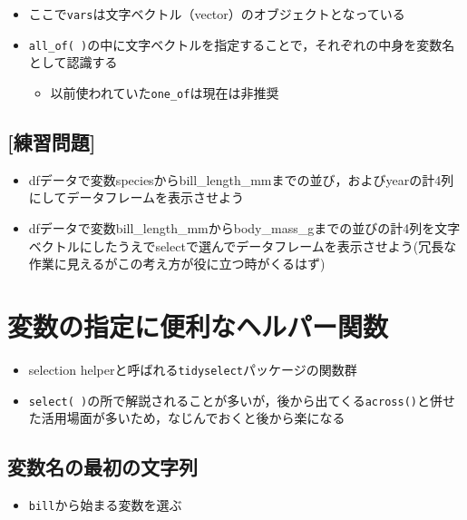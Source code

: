 \documentclass[
  xelatex,ja=standard, b5paper]{bxjsbook}
\providecommand{\tightlist}{%
  \setlength{\itemsep}{0pt}\setlength{\parskip}{0pt}}
\begin{document}
\begin{itemize}
\tightlist
\item
  ここで\texttt{vars}は文字ベクトル（vector）のオブジェクトとなっている
\item
  \texttt{all\_of(\ )}の中に文字ベクトルを指定することで，それぞれの中身を変数名として認識する

  \begin{itemize}
  \tightlist
  \item
    以前使われていた\texttt{one\_of}は現在は非推奨
  \end{itemize}
\end{itemize}

\hypertarget{ux7df4ux7fd2ux554fux984c}{%
\subsection{{[}練習問題{]}}\label{ux7df4ux7fd2ux554fux984c}}

\begin{itemize}
\item
  dfデータで変数speciesからbill\_length\_mmまでの並び，およびyearの計4列にしてデータフレームを表示させよう
\item
  dfデータで変数bill\_length\_mmからbody\_mass\_gまでの並びの計4列を文字ベクトルにしたうえでselectで選んでデータフレームを表示させよう(冗長な作業に見えるがこの考え方が役に立つ時がくるはず)
\end{itemize}

\hypertarget{select-helper}{%
\section{変数の指定に便利なヘルパー関数}\label{select-helper}}

\begin{itemize}
\tightlist
\item
  selection helperと呼ばれる\texttt{tidyselect}パッケージの関数群
\item
  \texttt{select(\ )}の所で解説されることが多いが，後から出てくる\texttt{across()}と併せた活用場面が多いため，なじんでおくと後から楽になる
\end{itemize}

\hypertarget{select-helper1}{%
\subsection{変数名の最初の文字列}\label{select-helper1}}

\begin{itemize}
\tightlist
\item
  \texttt{bill}から始まる変数を選ぶ
\end{itemize}
\end{document}

